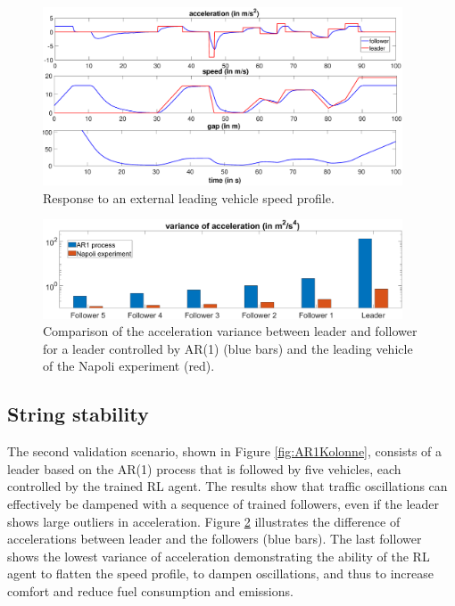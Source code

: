 \documentclass[review]{elsarticle}
\providecommand{\martin}[1]{#1}                  %
\providecommand{\3}{{\ss}}
\begin{document}
\begin{figure}
	\centering
	\includegraphics[width=0.95\textwidth]{images/manipulatedLeader.eps}
	\caption{Response to an external leading vehicle speed
          profile.}
	\label{fig:manipulatedLeader}
\end{figure}

\begin{figure}
	\centering
	\includegraphics[width=0.95\textwidth]{images/VarAccComp}
	\caption{Comparison of the acceleration variance between
          leader and follower for a leader controlled by AR(1) (blue
          bars) and the leading vehicle of the Napoli experiment
          (red).}
	\label{fig:VarAccComp}
\end{figure}






\subsection{String stability}
\label{sec:stringStability}
The second validation scenario, shown in Figure
\ref{fig:AR1Kolonne}, consists of a leader based on the AR(1) process
that is
followed by five vehicles, each controlled by the trained RL
agent. The results show that traffic oscillations can effectively be
dampened with a sequence of trained followers, even if the leader
shows large outliers in acceleration. Figure \ref{fig:VarAccComp}
illustrates the difference of accelerations between leader and the
followers (blue bars). The last follower shows the lowest variance of
acceleration \martin{demonstrating} the ability of the RL agent to
flatten the speed profile, to dampen oscillations, and thus to increase
comfort and reduce fuel consumption and emissions.   
\end{document}
